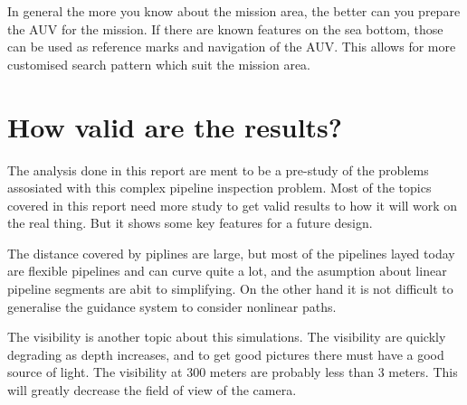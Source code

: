 	In general the more you know about the mission area, the better can you prepare the AUV for the
	mission. If there are known features on the sea bottom, those can be used as reference marks and
	navigation of the AUV. This allows for more customised search pattern which suit the mission area. 

\section{How valid are the results?}
	The analysis done in this report are ment to be a pre-study of the problems assosiated with this
	complex pipeline inspection problem. Most of the topics covered in this report need more study to get
	valid results to how it will work on the real thing. But it shows some key features for
	a future design.

	The distance covered by piplines are large, but most of the pipelines layed today are flexible
	pipelines and can curve quite a lot, and the asumption about linear pipeline segments are abit to
	simplifying. On the other hand it is not difficult to generalise the guidance system to consider
	nonlinear paths.

	The visibility is another topic about this simulations. The visibility are quickly degrading as depth
	increases, and to get good pictures there must have a good source of light. The visibility at 300
	meters are probably less than 3 meters. This will greatly decrease the field of view of the camera.

	
